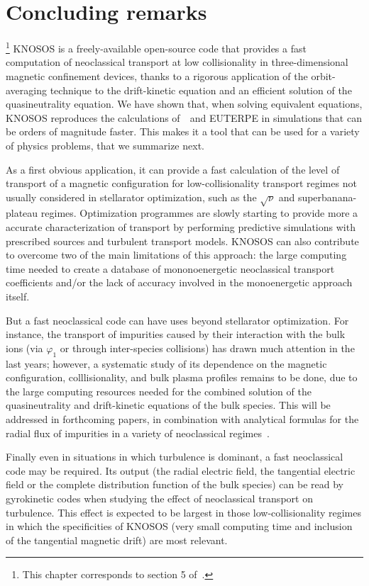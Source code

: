 \chapter{Concluding remarks}\label{CHAP_CONC}


\footnote{This chapter corresponds to section 5 of~\citep{velasco2019knosos}.}
{\ttfamily KNOSOS} is a freely-available open-source code that provides a fast computation of neoclassical transport at low collisionality in three-dimensional magnetic confinement devices, thanks to a rigorous application of the orbit-averaging technique to the drift-kinetic equation and an efficient solution of the quasineutrality equation. We have shown that, when solving equivalent equations, {\ttfamily KNOSOS} reproduces the calculations of~\DKES~and {\ttfamily EUTERPE} in simulations that can be orders of magnitude faster. This makes it a tool that can be used for a variety of physics problems, that we summarize next.

As a first obvious application, it can provide a fast calculation of the level of transport of a magnetic configuration for low-collisionality transport regimes not usually considered in stellarator optimization, such as the $\sqrt{\nu}$ and superbanana-plateau regimes. Optimization programmes are slowly starting to provide more a accurate characterization of transport by performing predictive simulations with prescribed sources and turbulent transport models. {\ttfamily KNOSOS} can also contribute to overcome two of the main limitations of this approach: the large computing time needed to create a database of mononoenergetic neoclassical transport coefficients and/or the lack of accuracy involved in the monoenergetic approach itself.
 
But a fast neoclassical code can have uses beyond stellarator optimization. For instance, the transport of impurities caused by their interaction with the bulk ions (via $\varphi_1$ or through inter-species collisions) has drawn much attention in the last years; however, a systematic study of its dependence on the magnetic configuration, colllisionality, and bulk plasma profiles remains to be done, due to the large computing resources needed for the combined solution of the quasineutrality and drift-kinetic equations of the bulk species. This will be addressed in forthcoming papers, in combination with analytical formulas for the radial flux of impurities in a variety of neoclassical regimes~\citep{calvo2018nf,calvo2019anis}.

Finally even in situations in which turbulence is dominant, a fast neoclassical code may be required. Its output (the radial electric field, the tangential electric field or the complete distribution function of the bulk species) can be read by gyrokinetic codes when studying the effect of neoclassical transport on turbulence. This effect is expected to be largest in those low-collisionality regimes in which the specificities of {\ttfamily KNOSOS} (very small computing time and inclusion of the tangential magnetic drift) are most relevant.
